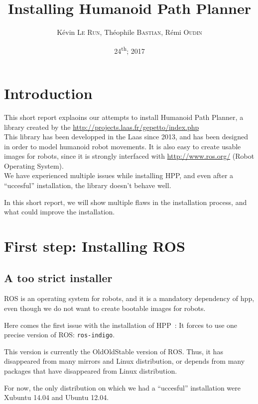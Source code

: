 \documentclass[a4paper, 11pt, titlepage]{article}
\author{Kévin \textsc{Le Run}, Théophile \textsc{Bastian}, Rémi \textsc{Oudin}}
\title{Installing Humanoid Path Planner}
\date{24\textsuperscript{th}; 2017}
\begin{document}
\maketitle

\tableofcontents

\newpage

\section*{Introduction}
\label{sec:intro}

This short report explaoins our attempts to install Humanoid Path Planner,
a library created by the \url{http://projects.laas.fr/gepetto/index.php}\\

This library has been developped in the Laas since 2013, and has been designed
in order to model humanoid robot movements. It is also easy to create usable
images for robots, since it is strongly interfaced with
\url{http://www.ros.org/} (Robot Operating System).\\

We have experienced multiple issues while installing HPP, and even after a
``uccesful'' installation, the library doesn't behave well.

In this short report, we will show multiple flaws in the installation process,
and what could improve the installation.

\section{First step: Installing ROS}

\subsection{A too strict installer}
ROS is an operating system for robots, and it is a mandatory dependency of hpp,
even though we do not want to create bootable images for robots.

Here comes the first issue with the installation of HPP~: It forces to use one
precise version of ROS\@: \verb|ros-indigo|.

This version is currently the OldOldStable version of ROS\@. Thus, it has
disappeared from many mirrors and Linux distribution, or depends from many
packages that have disappeared from Linux distribution.

For now, the only distribution on which we had a ``uccesful'' installation were
Xubuntu 14.04 and Ubuntu 12.04.
\end{document}
